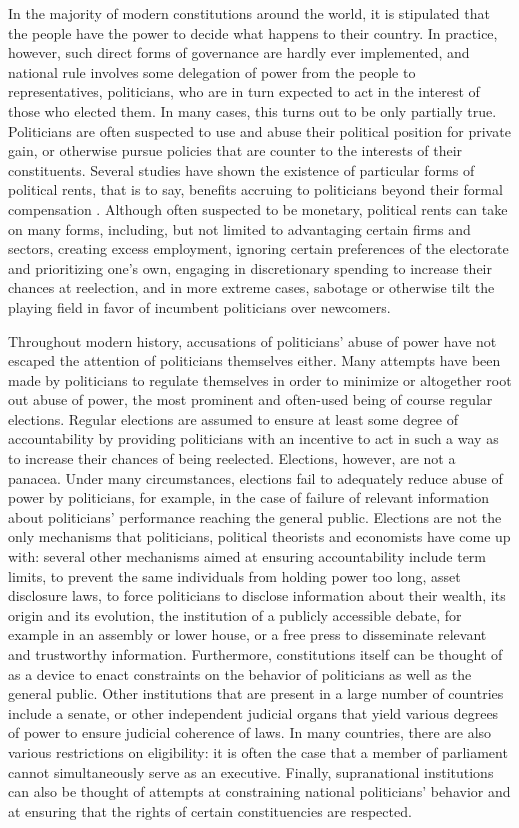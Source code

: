 \documentclass[12pt]{article}
\begin{document}
In the majority of modern constitutions around the world, it is stipulated that the people have the power to decide what happens to their country. In practice, however, such direct forms of governance are hardly ever implemented, and national rule involves some delegation of power from the people to representatives, politicians, who are in turn expected to act in the interest of those who elected them. In many cases, this turns out to be only partially true. Politicians are often suspected to use and abuse their political position for private gain, or otherwise pursue policies that are counter to the interests of their constituents. Several studies have shown the existence of particular forms of political rents, that is to say, benefits accruing to politicians beyond their formal compensation \citep{fisman2014private}. Although often suspected to be monetary, political rents can take on many forms, including, but not limited to advantaging certain firms and sectors, creating excess employment, ignoring certain preferences of the electorate and prioritizing one's own, engaging in discretionary spending to increase their chances at reelection, and in more extreme cases, sabotage or otherwise tilt the playing field in favor of incumbent politicians over newcomers. 

Throughout modern history, accusations of politicians' abuse of power have not escaped the attention of politicians themselves either. Many attempts have been made by politicians to regulate themselves in order to minimize or altogether root out abuse of power, the most prominent and often-used being of course regular elections. Regular elections are assumed to ensure at least some degree of accountability by providing politicians with an incentive to act in such a way as to increase their chances of being reelected. Elections, however, are not a panacea. Under many circumstances, elections fail to adequately reduce abuse of power by politicians, for example, in the case of failure of relevant information about politicians' performance reaching the general public. Elections are not the only mechanisms that politicians, political theorists and economists have come up with: several other mechanisms aimed at ensuring accountability include term limits, to prevent the same individuals from holding power too long, asset disclosure laws, to force politicians to disclose information about their wealth, its origin and its evolution, the institution of a publicly accessible debate, for example in an assembly or lower house, or a free press to disseminate relevant and trustworthy information. Furthermore, constitutions itself can be thought of as a device to enact constraints on the behavior of politicians as well as the general public. Other institutions that are present in a large number of countries include a senate, or other independent judicial organs that yield various degrees of power to ensure judicial coherence of laws. In many countries, there are also various restrictions on eligibility: it is often the case that a member of parliament cannot simultaneously serve as an executive. Finally, supranational institutions can also be thought of attempts at constraining national politicians' behavior and at ensuring that the rights of certain constituencies are respected. 
\end{document}
